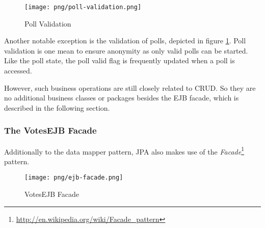 \begin{figure}[h]
\centering
\texttt{[image: png/poll-validation.png]}
\caption{Poll Validation}
\label{figure:poll-validation}
\end{figure}

Another notable exception is the validation of polls, depicted in figure \ref{figure:poll-validation}.
Poll validation is one mean to ensure anonymity as only valid polls can be started.
Like the poll state, the poll valid flag is frequently updated when a poll is accessed.

However, such business operations are still closely related to CRUD.
So they are no additional business classes or packages besides the EJB facade, which is described in the following section.

\subsubsection{The VotesEJB Facade}
\label{subsubsec:the-votesejb-facade}
Additionally to the data mapper pattern, JPA also makes use of the \textit{Facade}\footnote{\url{http://en.wikipedia.org/wiki/Facade_pattern}} pattern.

\begin{figure}[h]
\centering
\texttt{[image: png/ejb-facade.png]}
\caption{VotesEJB Facade}
\label{figure:ejb-facade}
\end{figure}


